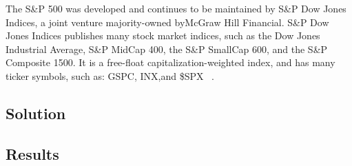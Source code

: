     The S\&P 500 was developed and continues to be maintained by S\&P Dow Jones Indices, a joint venture majority-owned byMcGraw Hill Financial. S\&P Dow Jones Indices publishes many stock market indices, such as the Dow Jones Industrial Average, S\&P MidCap 400, the S\&P SmallCap 600, and the S\&P Composite 1500. It is a free-float capitalization-weighted index, and has many ticker symbols, such as: GSPC, INX,and \$SPX ~\cite{Sel5}.


\subsection{Solution}

\subsection{Results}






























